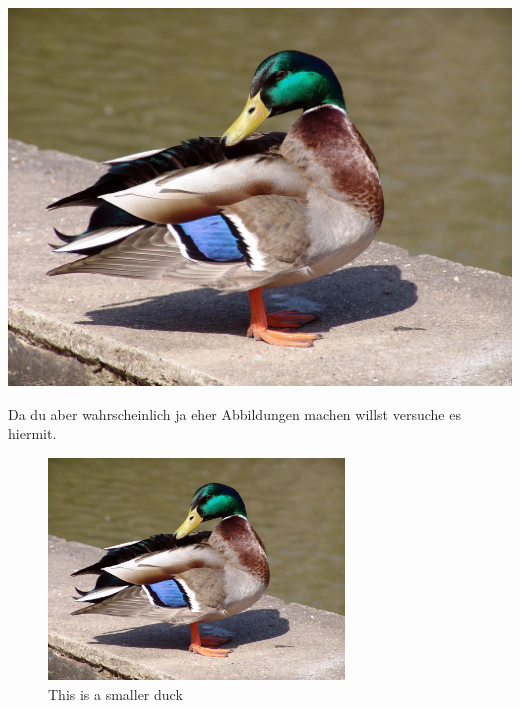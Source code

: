 \includegraphics[width=\textwidth]{images/duck.jpg}


Da du aber wahrscheinlich ja eher Abbildungen machen willst versuche es hiermit.

\begin{figure}[h]
	\centering
	\includegraphics[width=0.7\textwidth]{images/duck.jpg}
	\caption{This is a smaller duck}
	\label{fig:duck}
\end{figure}
